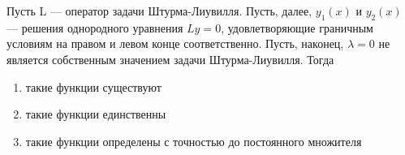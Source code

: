 Пусть L — оператор задачи Штурма-Лиувилля. Пусть, далее, \(y_1(x)\) и \(y_2(x)\) — решения однородного уравнения \(Ly = 0\), удовлетворяющие граничным условиям на правом и левом конце соответственно. Пусть, наконец, \(\lambda = 0\) не является собственным значением задачи Штурма-Лиувилля. Тогда

\begin{enumerate}[label=\arabic*)]
    \item такие функции существуют
    \item такие функции единственны
    \item такие функции определены с точностью до постоянного множителя
\end{enumerate}

